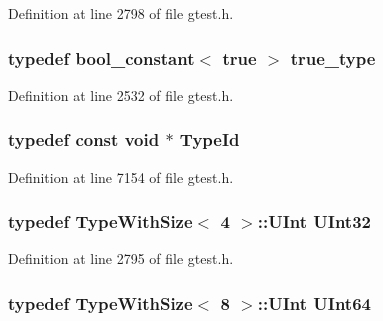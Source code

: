\-Definition at line 2798 of file gtest.\-h.

\hypertarget{namespacetesting_1_1internal_a6f18ab9cf27798886d6a0f222dc004bc}{
\subsubsection[{true\-\_\-type}]{\setlength{\rightskip}{0pt plus 5cm}typedef {\bf bool\-\_\-constant}$<$ true $>$ {\bf true\-\_\-type}}}\label{d0/da7/namespacetesting_1_1internal_a6f18ab9cf27798886d6a0f222dc004bc}


\-Definition at line 2532 of file gtest.\-h.

\hypertarget{namespacetesting_1_1internal_ac8e91f0c6a06c0361dc3152ddfeb2342}{
\subsubsection[{\-Type\-Id}]{\setlength{\rightskip}{0pt plus 5cm}typedef const void $\ast$ {\bf \-Type\-Id}}}\label{d0/da7/namespacetesting_1_1internal_ac8e91f0c6a06c0361dc3152ddfeb2342}


\-Definition at line 7154 of file gtest.\-h.

\hypertarget{namespacetesting_1_1internal_a03df445d5850459574de6ffb6f57ae95}{
\subsubsection[{\-U\-Int32}]{\setlength{\rightskip}{0pt plus 5cm}typedef {\bf \-Type\-With\-Size}$<$ 4 $>$\-::\-U\-Int {\bf \-U\-Int32}}}\label{d0/da7/namespacetesting_1_1internal_a03df445d5850459574de6ffb6f57ae95}


\-Definition at line 2795 of file gtest.\-h.

\hypertarget{namespacetesting_1_1internal_ad44e156098a845911b5d4788b9512930}{
\subsubsection[{\-U\-Int64}]{\setlength{\rightskip}{0pt plus 5cm}typedef {\bf \-Type\-With\-Size}$<$ 8 $>$\-::\-U\-Int {\bf \-U\-Int64}}}\label{d0/da7/namespacetesting_1_1internal_ad44e156098a845911b5d4788b9512930}


